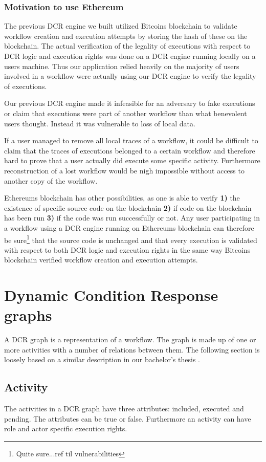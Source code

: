 \documentclass{article}
\begin{document}
			\subsubsection{Motivation to use Ethereum}
			The previous DCR engine we built utilized Bitcoins blockchain to validate workflow creation and execution attempts by storing the hash of these on the blockchain.
			The actual verification of the legality of executions with respect to DCR logic and execution rights was done on a DCR engine running locally on a users machine.
			Thus our application relied heavily on the majority of users involved in a workflow were actually using our DCR engine to verify the legality of executions. 

			Our previous DCR engine made it infeasible for an adversary to fake executions or claim that executions were part of another workflow than what benevolent users thought.
			Instead it was vulnerable to loss of local data. 
			
			If a user managed to remove all local traces of a workflow, it could be difficult to claim that the traces of executions belonged to a certain workflow and therefore hard to prove that a user actually did execute some specific activity. Furthermore reconstruction of a lost workflow would be nigh impossible without access to another copy of the workflow.

			Ethereums blockchain has other possibilities, as one is able to verify \textbf{1)} the existence of specific source code on the blockchain \textbf{2)} if code on the blockchain has been run \textbf{3)} if the code was run successfully or not.
			Any user participating in a workflow using a DCR engine running on Ethereums blockchain can therefore be sure\footnote{Quite sure...ref til vulnerabilities} that the source code is unchanged and that every execution is validated with respect to both DCR logic and execution rights in the same way Bitcoins blockchain verified workflow creation and execution attempts.

	\section{Dynamic Condition Response graphs}
	\label{sec:dcr-graphs}
	A DCR graph is a representation of a workflow.
	The graph is made up of one or more activities with a number of relations between them. 
	The following section is loosely based on a similar description in our bachelor's thesis \cite{bachelor}. 

		\subsection{Activity}
		The activities in a DCR graph have three attributes: included, executed and pending. 
		The attributes can be true or false. 
		Furthermore an activity can have role and actor specific execution rights.
\end{document}

